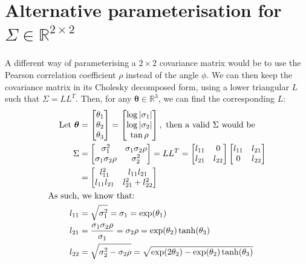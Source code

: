\documentclass[a4paper, 12pt]{report}
\begin{document}
\section{Alternative parameterisation for $\Sigma \in \mathbb{R}^{2\times 2}$}
\label{sec:pearson}
A different way of parameterising a $2\times 2$ covariance matrix  would be to use the Pearson correlation coefficient $\rho$ instead of the angle $\phi$. 
We can then keep the covariance matrix in its Cholesky decomposed form, using a lower triangular $L$ such that $\Sigma=LL^T$. Then, for any $\boldsymbol{\theta}\in\mathbb{R}^3$, we can find the corresponding $L$:
\begin{align}
\textrm{Let }\boldsymbol{\theta}&=\begin{bmatrix}
	\theta_1\\
	\theta_2\\
	\theta_3\\
\end{bmatrix}=\begin{bmatrix}
	\log|\sigma_1| \\
	\log|\sigma_2|\\
	\tan\rho\\
\end{bmatrix}, \textrm{ then a valid $\Sigma$ would be} \\
	\Sigma &= \begin{bmatrix}
 \sigma_1^2 & \sigma_1\sigma_2\rho \\
  \sigma_1\sigma_2\rho & \sigma_2^2 \\
\end{bmatrix}
= LL^T = \begin{bmatrix}
 l_{11} & 0 \\
  l_{21} & l_{22} \\
\end{bmatrix}\begin{bmatrix}
 l_{11} & l_{21} \\
  0 & l_{22} \\
\end{bmatrix}\\
&=\begin{bmatrix}
 l_{11}^2 & l_{11}l_{21} \\
  l_{11}l_{21} & l_{21}^2 + l_{22}^2 \\
\end{bmatrix}\hspace{0.5cm}\\
\textrm{As such,}&\textrm{ we know that:}\nonumber\\
	l_{11} &= \sqrt{\sigma_1^2} =\sigma_1=\exp(\theta_1)\\
	l_{21} &= \frac{\sigma_1\sigma_2\rho}{\sigma_1}=\sigma_2\rho=\exp(\theta_2)\tanh(\theta_3) \\
	l_{22} &= \sqrt{\sigma_2^2 - \sigma_2\rho} = \sqrt{\exp(2\theta_2)-\exp(\theta_2)\tanh(\theta_3)}
\end{align}
\end{document}
